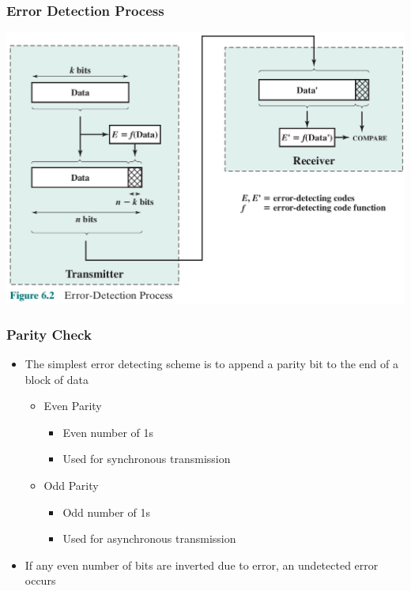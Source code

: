 \documentclass[pdflatex,compress]{beamer}
\begin{document}
\begin{frame}
	\frametitle{Error Detection Process}
	\begin{center}
		\includegraphics[width=\linewidth]{img/img02}
	\end{center}
\end{frame}

\begin{frame}
	\frametitle{Parity Check}
	\begin{itemize}
		\item The simplest error detecting scheme is to append a parity bit to the end of a block of data
		\begin{itemize}
			\item Even Parity
			\begin{itemize}
				\item Even number of 1s
				\item Used for synchronous transmission
			\end{itemize}
			\item Odd Parity
			\begin{itemize}
				\item Odd number of 1s
				\item Used for asynchronous transmission
			\end{itemize}
		\end{itemize}
		\item If any even number of bits are inverted due to error, an undetected error occurs
	\end{itemize}
\end{frame}
\end{document}
